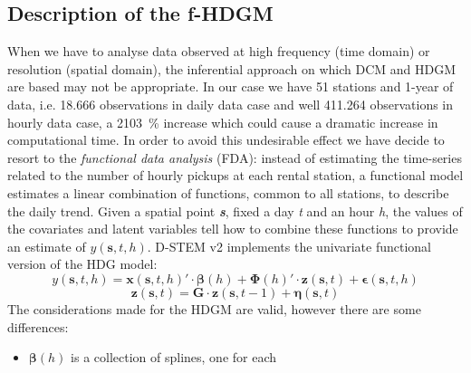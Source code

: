 \subsection{Description of the f-HDGM}
When we have to analyse data observed at high frequency (time domain) or resolution (spatial domain), the inferential approach on which DCM and HDGM are based may not be appropriate. In our case we have \num{51} stations and \num{1}-year of data, i.e. \num{18,666} observations in daily data case and well \num{411,264} observations in hourly data case, a \SI{2103}{\percent} increase which could cause a dramatic increase in computational time. In order to avoid this undesirable effect we have decide to resort to the \textit{functional data analysis} (FDA): instead of estimating the time-series related to the number of hourly pickups at each rental station, a functional model estimates a linear combination of functions, common to all stations, to describe the daily trend. Given a spatial point \textit{\textbf{s}}, fixed a day \textit{t} and an hour \textit{h}, the values of the covariates and latent variables tell how to combine these functions to provide an estimate of $y(\boldsymbol{s}, t, h)$. D-STEM v\num{2} implements the univariate functional version of the HDG model:
\begin{displaymath}
	y(\boldsymbol{s}, t, h) = \boldsymbol{x}(\boldsymbol{s}, t, h)' \cdot \boldsymbol{\beta}(h) + \boldsymbol{\Phi}(h)' \cdot \boldsymbol{z}(\boldsymbol{s}, t) + \boldsymbol{\epsilon}(\boldsymbol{s}, t, h)
\end{displaymath} 
\begin{displaymath}
	\boldsymbol{z}(\boldsymbol{s}, t) = \boldsymbol{G} \cdot \boldsymbol{z}(\boldsymbol{s}, t-1) + \boldsymbol{\eta}(\boldsymbol{s}, t)
\end{displaymath}
The considerations made for the HDGM are valid, however there are some differences:
\begin{itemize}
	\item $\boldsymbol{\beta}(h)$ is a collection of splines, one for each
\end{itemize}